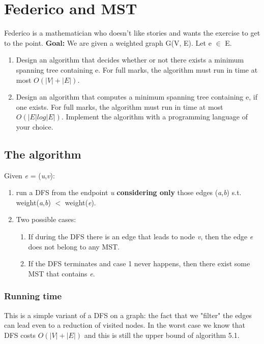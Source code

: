 \section{Federico and MST}
Federico is a mathematician who doesn't like stories and wants the exercise to get to the point.
\newline
\textbf{Goal:} We are given a weighted graph G(V, E). Let e $\in$ E.
\begin{enumerate}
	\item Design an algorithm that decides whether or not there exists a minimum spanning tree containing e. For full marks, the algorithm must run in time at most $O(|V | + |E|)$.
	\item Design an algorithm that computes a minimum spanning tree containing e, if one exists. For full marks, the algorithm must run in time at most $O(|E| log |E|)$. Implement the algorithm with a programming language of your choice.
\end{enumerate}

\subsection{The algorithm}
Given \textit{e} = (\textit{u},\textit{v}):
\begin{enumerate}
	\item run a DFS from the endpoint \textit{u} \textbf{considering only} those edges (\textit{a},\textit{b}) s.t. weight(\textit{a},\textit{b}) $<$ weight(\textit{e}).
	\item Two possible cases:
	\begin{enumerate}
		\item If during the DFS there is an edge that leads to node \textit{v}, then the edge \textit{e} does not belong to any MST.
		\item If the DFS terminates and case 1 never happens, then there exist some MST that contains \textit{e}.
	\end{enumerate}
\end{enumerate}

\subsubsection{Running time}
This is a simple variant of a DFS on a graph: the fact that we "filter" the edges can lead even to a reduction of visited nodes. In the worst case we know that DFS costs $O(|V| + |E|)$ and this is still the upper bound of algorithm 5.1.

